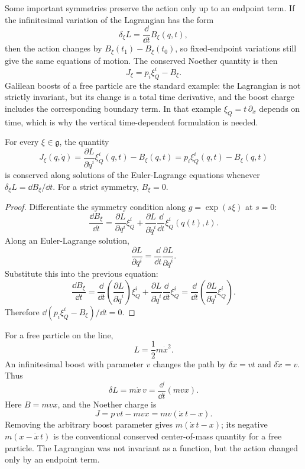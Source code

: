 Some important symmetries preserve the action only up to an endpoint term. If
the infinitesimal variation of the Lagrangian has the form
\[
  \delta_\xi L=\frac{\dd}{\dd t}B_\xi(q,t),
\]
then the action changes by \(B_\xi(t_1)-B_\xi(t_0)\), so fixed-endpoint
variations still give the same equations of motion. The conserved Noether
quantity is then
\[
  J_\xi=p_i\xi_Q^i-B_\xi.
\]
Galilean boosts of a free particle are the standard example: the Lagrangian is
not strictly invariant, but its change is a total time derivative, and the
boost charge includes the corresponding boundary term.  In that example
\(\xi_Q=t\,\partial_x\) depends on time, which is why the vertical
time-dependent formulation is needed.

\begin{proposition}
For every \(\xi\in\mathfrak g\), the quantity
\[
  J_\xi(q,\dot q)
  =
  \frac{\partial L}{\partial \dot q^i}\xi_Q^i(q,t)
  -B_\xi(q,t)
  =
  p_i\xi_Q^i(q,t)-B_\xi(q,t)
\]
is conserved along solutions of the Euler-Lagrange equations whenever
\(\delta_\xi L=\dd B_\xi/\dd t\). For a strict symmetry, \(B_\xi=0\).
\end{proposition}

\begin{proof}
Differentiate the symmetry condition along \(g=\exp(s\xi)\) at \(s=0\):
\[
  \frac{\dd B_\xi}{\dd t}=
  \frac{\partial L}{\partial q^i}\xi_Q^i
  +
  \frac{\partial L}{\partial \dot q^i}
  \frac{\dd}{\dd t}\xi_Q^i(q(t),t).
\]
Along an Euler-Lagrange solution,
\[
  \frac{\partial L}{\partial q^i}
  =
  \frac{\dd}{\dd t}\frac{\partial L}{\partial \dot q^i}.
\]
Substitute this into the previous equation:
\[
  \frac{\dd B_\xi}{\dd t}=
  \frac{\dd}{\dd t}\left(\frac{\partial L}{\partial \dot q^i}\right)\xi_Q^i
  +
  \frac{\partial L}{\partial \dot q^i}
  \frac{\dd}{\dd t}\xi_Q^i
  =
  \frac{\dd}{\dd t}
  \left(
    \frac{\partial L}{\partial \dot q^i}\xi_Q^i
  \right).
\]
Therefore \(\dd(p_i\xi_Q^i-B_\xi)/\dd t=0\).
\end{proof}

\begin{example}
For a free particle on the line,
\[
  L=\frac12m\dot x^2.
\]
An infinitesimal boost with parameter \(v\) changes the path by
\(\delta x=vt\) and \(\delta\dot x=v\). Thus
\[
  \delta L=m\dot x\,v=\frac{\dd}{\dd t}(mvx).
\]
Here \(B=mvx\), and the Noether charge is
\[
  J=p\,vt-mvx=mv(\dot x\,t-x).
\]
Removing the arbitrary boost parameter gives \(m(\dot x\,t-x)\); its negative
\(m(x-\dot x\,t)\) is the conventional conserved center-of-mass quantity for a
free particle. The Lagrangian was not invariant as a function, but the action
changed only by an endpoint term.
\end{example}

